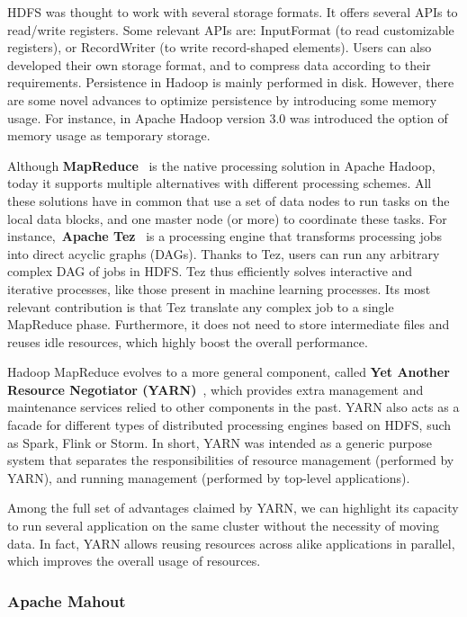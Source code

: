 \documentclass[3p,review]{elsarticle}
\begin{document}
HDFS was thought to work with several storage formats. It offers several APIs to read/write registers. Some relevant APIs are: InputFormat (to read customizable registers), or RecordWriter (to write record-shaped elements). Users can also developed their own storage format, and to compress data according to their requirements. Persistence in Hadoop is mainly performed in disk. However, there are some novel advances to optimize persistence by introducing some memory usage. For instance, in Apache Hadoop version 3.0 was introduced the option of memory usage as temporary storage.

Although \textbf{MapReduce}~\cite{dean04} is the native processing solution in Apache Hadoop, today it supports multiple alternatives with different processing schemes. All these solutions have in common that use a set of data nodes to run tasks on the local data blocks, and one master node (or more) to coordinate these tasks. For instance,~\textbf{Apache Tez}~\cite{tez} is a processing engine that transforms processing jobs into direct acyclic graphs (DAGs). Thanks to Tez, users can run any arbitrary complex DAG of jobs in HDFS. Tez thus efficiently solves interactive and iterative processes, like those present in machine learning processes. Its most relevant contribution is that Tez translate any complex job to a single MapReduce phase. Furthermore, it does not need to store intermediate files and reuses idle resources, which highly boost the overall performance.

Hadoop MapReduce evolves to a more general component, called \textbf{Yet Another Resource Negotiator (YARN)}~\cite{yarn}, which provides extra management and maintenance services relied to other components in the past. YARN also acts as a facade for different types of distributed processing engines based on HDFS, such as Spark, Flink or Storm. In short, YARN was intended as a generic purpose system that separates the responsibilities of resource management (performed by YARN), and running management (performed by top-level applications).

Among the full set of advantages claimed by YARN, we can highlight its capacity to run several application on the same cluster without the necessity of moving data. In fact, YARN allows reusing resources across alike applications in parallel, which improves the overall usage of resources.

\subsubsection{Apache Mahout}
\end{document}
